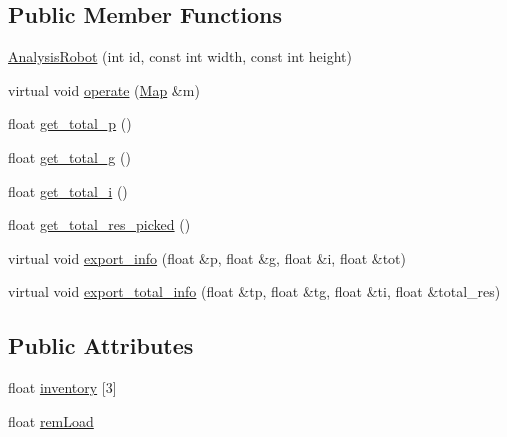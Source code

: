 \subsection*{Public Member Functions}
\begin{DoxyCompactItemize}
\item 
\hyperlink{class_analysis_robot_a4bc986573a8c243c3491e2c31099a50b}{Analysis\-Robot} (int id, const int width, const int height)
\item 
virtual void \hyperlink{class_analysis_robot_a496ce06a9eee3fcbb521dd6eb9ef7947}{operate} (\hyperlink{class_map}{Map} \&m)
\item 
float \hyperlink{class_analysis_robot_a054aeffeadbe44c99bff3ca9069d3f5d}{get\-\_\-total\-\_\-p} ()
\item 
float \hyperlink{class_analysis_robot_a4b673c341a4c706a99ad0df16b2ad1f6}{get\-\_\-total\-\_\-g} ()
\item 
float \hyperlink{class_analysis_robot_ab72c7c197faef7c9e30f502414a15b50}{get\-\_\-total\-\_\-i} ()
\item 
float \hyperlink{class_analysis_robot_a69ab14d80084ad9c5f0d7be077b04a65}{get\-\_\-total\-\_\-res\-\_\-picked} ()
\item 
virtual void \hyperlink{class_analysis_robot_a984f9a02843c487538dcb8029f15ce1f}{export\-\_\-info} (float \&p, float \&g, float \&i, float \&tot)
\item 
virtual void \hyperlink{class_analysis_robot_a090c8f17c57af7c3073905fa9bedbf2c}{export\-\_\-total\-\_\-info} (float \&tp, float \&tg, float \&ti, float \&total\-\_\-res)
\end{DoxyCompactItemize}
\subsection*{Public Attributes}
\begin{DoxyCompactItemize}
\item 
float \hyperlink{class_analysis_robot_a1cc3b0734f5e183c01aedf9fb563e9bb}{inventory} \mbox{[}3\mbox{]}
\item 
float \hyperlink{class_analysis_robot_a14ed4ba869e1dedc9100c1ce357b235d}{rem\-Load}
\end{DoxyCompactItemize}


